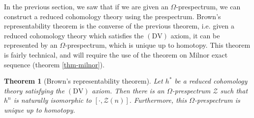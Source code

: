 \documentclass[12pt, notitlepage]{article}
\newtheorem{thm}{Theorem}[section]
\theoremstyle{definition}
\newcommand{\calz}{\mathcal{Z}}
\begin{document}
In the previous section, we saw that if we are given an $\Omega$-prespectrum, we can construct a
reduced cohomology theory using the prespectrum. Brown's representability theorem is the converse of
the previous theorem, i.e. given a reduced cohomology theory which satisfies the $(\mathrm{DV})$ axiom, it can be represented by an
$\Omega$-prespectrum, which is unique up to homotopy. This theorem is fairly technical, and will
require the use of the theorem on Milnor exact sequence (theorem \ref{thm-milnor}).

\begin{thm}[Brown's representability theorem]
  Let $h^{\ast}$ be a reduced cohomology theory satisfying the $(\mathrm{DV})$ axiom. Then there
  is an $\Omega$-prespectrum $\calz$ such that $h^{n}$ is naturally isomorphic to
  $\left[\cdot, \calz(n) \right]$. Furthermore, this $\Omega$-prespectrum is unique up to homotopy.
\end{thm}
\end{document}
